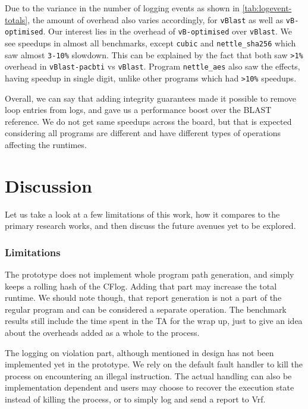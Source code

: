 \documentclass[a4paper, nobind]{templates/ociamthesis}
\begin{document}
Due to the variance in the number of logging events as shown in \ref{tab:logevent-totals},
the amount of overhead also varies accordingly, for \texttt{vBlast} as well as \texttt{vB-optimised}.
Our interest lies in the overhead of \texttt{vB-optimised} over \texttt{vBlast}. We see speedups
in almost all benchmarks, except \texttt{cubic} and \texttt{nettle\_sha256} which saw almost \texttt{3-10\%}
slowdown. This can be explained by the fact that both saw \texttt{\textgreater{}1\%} overhead in
\texttt{vBlast-pacbti} vs \texttt{vBlast}. Program \texttt{nettle\_aes} also saw the effects, having speedup
in single digit, unlike other programs which had \texttt{\textgreater{}10\%} speedups.

Overall, we can say that adding integrity guarantees made it possible to remove
loop entries from logs, and gave us a performance boost over the BLAST reference.
We do not get same speedups across the board, but that is expected considering all
programs are different and have different types of operations affecting the runtimes.

\chapter{Discussion}\label{discussion}

\minitoc 

Let us take a look at a few limitations of this work, how it compares to
the primary research works, and then discuss the future avenues yet to be explored.

\subsection*{Limitations}\label{limitations-1}

The prototype does not implement whole program path generation, and simply keeps
a rolling hash of the CFlog. Adding that part may increase the total runtime. We
should note though, that report generation is not a part of the regular program
and can be considered a separate operation. The benchmark results still include the
time spent in the TA for the wrap up, just to give an idea about the overheads
added as a whole to the process.

The logging on violation part, although mentioned in design has not been implemented yet
in the prototype. We rely on the default fault handler to kill the process on encountering
an illegal instruction. The actual handling can also be implementation dependent
and users may choose to recover the execution state instead of killing the process,
or to simply log and send a report to Vrf.
\end{document}
